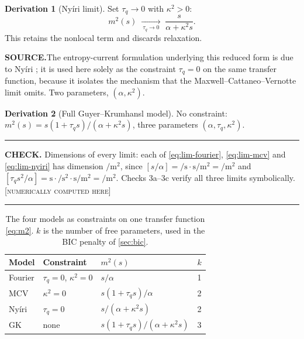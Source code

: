 \documentclass[11pt,a4paper]{article}
\theoremstyle{definition}
\newtheorem{derivationx}{Derivation}[section]
\newenvironment{checkbox}%
  {\par\medskip\noindent\begin{minipage}{\linewidth}%
   \rule{\linewidth}{0.4pt}\par\noindent\textbf{CHECK.}\enspace}%
  {\par\rule{\linewidth}{0.4pt}\end{minipage}\par\medskip}
\newcommand{\source}[1]{\par\smallskip\noindent\textbf{SOURCE.}\enspace #1\par}
\newcommand{\NUM}{\textcolor{red!55!black}{\footnotesize[\textsc{numerically computed here}]}}
\newcommand{\tq}{\tau_{q}}
\newcommand{\kk}{\kappa^{2}}
\begin{document}
\begin{derivationx}[Nyíri limit]
\label{der:nyiri}
Set $\tq\to0$ with $\kk>0$:
\begin{equation}
  m^{2}(s)
   \;\xrightarrow[\ \tq\to0\ ]{}\;
   \frac{s}{\alpha+\kk s} .
  \label{eq:lim-nyiri}
\end{equation}
This retains the nonlocal term and discards relaxation.
\end{derivationx}

\source{The entropy-current formulation underlying this reduced form is due to
Nyíri \cite{Nyiri1991}; it is used here solely as the constraint $\tq=0$ on the
same transfer function, because it isolates the mechanism that the
Maxwell--Cattaneo--Vernotte limit omits. Two parameters, $(\alpha,\kk)$.}

\begin{derivationx}[Full Guyer--Krumhansl model]
\label{der:gkfull}
No constraint: $m^{2}(s)=s(1+\tq s)/(\alpha+\kk s)$, three parameters
$(\alpha,\tq,\kk)$.
\end{derivationx}

\begin{checkbox}
Dimensions of every limit: each of \eqref{eq:lim-fourier},
\eqref{eq:lim-mcv} and \eqref{eq:lim-nyiri} has dimension
$\si{\per\metre\squared}$, since $[s/\alpha]=\si{\per\second}\cdot
\si{\second\per\metre\squared}=\si{\per\metre\squared}$ and
$[\tq s^{2}/\alpha]=\si{\second}\cdot\si{\per\second\squared}\cdot
\si{\second\per\metre\squared}=\si{\per\metre\squared}$. Checks 3a--3c verify
all three limits symbolically. \NUM
\end{checkbox}

\begin{table}[H]
\centering
\caption{The four models as constraints on one transfer function
         \eqref{eq:m2}. $k$ is the number of free parameters, used in the
         BIC penalty of \cref{sec:bic}.}
\label{tab:models}
\small
\begin{tabular}{@{}llll@{}}
\toprule
\textbf{Model} & \textbf{Constraint} & $m^{2}(s)$ & $k$ \\
\midrule
Fourier & $\tq=0$, $\kk=0$ & $s/\alpha$ & 1 \\
MCV     & $\kk=0$          & $s(1+\tq s)/\alpha$ & 2 \\
Nyíri   & $\tq=0$          & $s/(\alpha+\kk s)$  & 2 \\
GK      & none             & $s(1+\tq s)/(\alpha+\kk s)$ & 3 \\
\bottomrule
\end{tabular}
\end{table}
\end{document}
